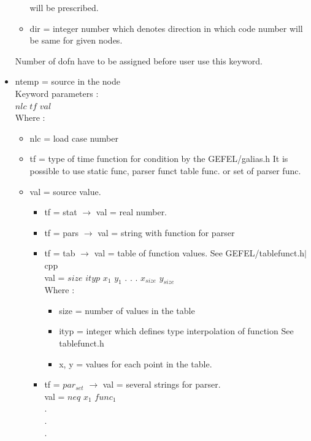 \documentclass[12pt]{book}
\begin{document}
\begin{itemize}
\begin{itemize}
               will be prescribed.
        \item dir  = integer number which denotes direction in which code number
               will be same for given nodes.
        \end{itemize}
        Number of dofn have to be assigned before user use this keyword.
\item ntemp = source in the node\\
        Keyword parameters :\\
        $nlc$ $tf$ $val$\\
        Where :
        \begin{itemize}
        \item nlc = load case number
        \item tf  = type of time function for condition by the GEFEL/galias.h
               It is possible to use static func, parser funct table func. or
               set of parser func.
        \item val  = source value.
               \begin{itemize}
               \item tf = stat $\to$ val = real number.
               \item tf = pars $\to$ val = string with function for parser
               \item tf = tab  $\to$ val = table of function values. See GEFEL/tablefunct.h$\mid$cpp\\
                    val = $size$ $ityp$ $x_1$ $y_1$ . . . $x_{size}$ $y_{size}$\\
                    Where :
                    \begin {itemize}
                    \item size = number of values in the table
                    \item ityp = integer which defines type interpolation of function
                           See tablefunct.h
                    \item x, y = values for each point in the table.
                    \end{itemize} 
               \item tf = $par_{set}$ $\to$ val = several strings for parser.\\
                     val = $neq$ $x_1$ $func_1$\\
                         .\\
                         .\\
                         .\\

\end{itemize}
\end{itemize}
\end{itemize}
\end{document}
